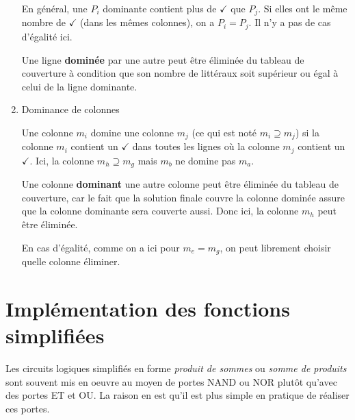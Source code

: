 \documentclass[letter, oneside]{book}
\begin{document}
\begin{enumerate}
En général, une \(P_i\) dominante contient plus de \(\checkmark\) que \(P_j\). Si
elles ont le même nombre de \(\checkmark\) (dans les mêmes colonnes), on a \(P_i =
P_j\). Il n'y a pas de cas d'égalité ici.

Une ligne \textbf{dominée} par une autre peut être éliminée du tableau de
couverture à condition que son nombre de littéraux soit supérieur ou
égal à celui de la ligne dominante.

\item Dominance de colonnes
\label{sec:orgf27f8b9}

Une colonne \(m_i\) domine une colonne \(m_j\) (ce qui est noté \(m_i \supseteq
m_j\)) si la colonne \(m_i\) contient un \(\checkmark\) dans toutes les lignes où
la colonne \(m_j\) contient un \(\checkmark\). Ici, la colonne \(m_h \supseteq
m_g\) mais \(m_b\) ne domine pas \(m_a\). 

Une colonne \textbf{dominant} une autre colonne peut être éliminée du tableau de
couverture, car le fait que la solution finale couvre la colonne
dominée assure que la colonne dominante sera couverte aussi. Donc ici,
la colonne \(m_h\) peut être éliminée.

En cas d'égalité, comme on a ici pour \(m_e = m_g\), on peut librement
choisir quelle colonne éliminer.
\end{enumerate}

\section{Implémentation des fonctions simplifiées}
\label{sec:org9a136d7}

Les circuits logiques simplifiés en forme \emph{produit de sommes} ou
\emph{somme de produits} sont souvent mis en oeuvre au moyen de portes NAND
ou NOR plutôt qu'avec des portes ET et OU. La raison en est qu'il est
plus simple en pratique de réaliser ces portes.
\end{document}
